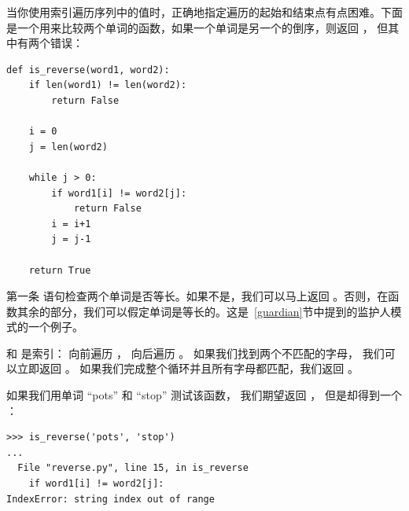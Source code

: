 当你使用索引遍历序列中的值时，正确地指定遍历的起始和结束点有点困难。下面是一个用来比较两个单词的函数，如果一个单词是另一个的倒序，则返回  ， 但其中有两个错误：

\begin{lstlisting}
def is_reverse(word1, word2):
    if len(word1) != len(word2):
        return False

    i = 0
    j = len(word2)

    while j > 0:
        if word1[i] != word2[j]:
            return False
        i = i+1
        j = j-1

    return True
\end{lstlisting}

%
  

第一条  语句检查两个单词是否等长。如果不是，我们可以马上返回  。否则，在函数其余的部分，我们可以假定单词是等长的。这是~\ref{guardian}节中提到的监护人模式的一个例子。


 和  是索引： 向前遍历 ， 向后遍历 。 如果我们找到两个不匹配的字母， 我们可以立即返回 。 如果我们完成整个循环并且所有字母都匹配，我们返回  。

  

如果我们用单词 ``pots'' 和 ``stop'' 测试该函数， 我们期望返回  ， 但是却得到一个 ：

\begin{lstlisting}
>>> is_reverse('pots', 'stop')
...
  File "reverse.py", line 15, in is_reverse
    if word1[i] != word2[j]:
IndexError: string index out of range
\end{lstlisting}

